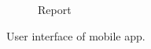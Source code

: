 \begin{figure}
\begin{subfigure}[b]{0.125\textwidth}
        \caption{Report}
        \label{fig:documentation}
    \end{subfigure}
    \hfill %
    \vspace{0.2cm}
    \caption[{User Interface of Mobile App.}]{User interface of mobile app.}\label{fig:hysterisis}
\end{figure}
